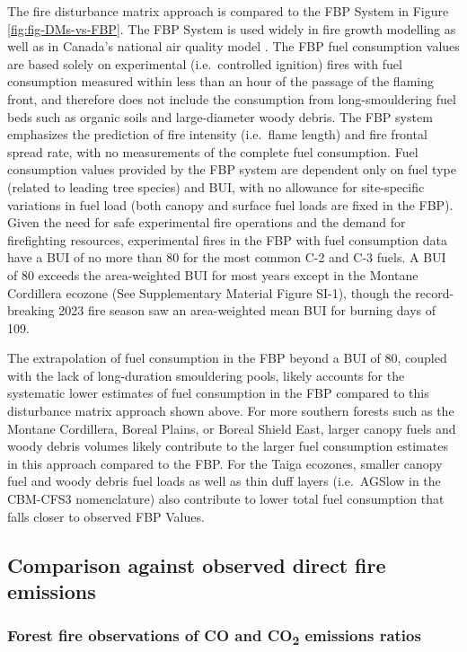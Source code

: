 \documentclass[, manuscript]{copernicus}
\begin{document}
The fire disturbance matrix approach is compared to the FBP System in
Figure \ref{fig:fig-DMs-vs-FBP}. The FBP System is used widely in fire
growth modelling as well as in Canada's national air quality model
\citep{chen2019}. The FBP fuel consumption values are based solely on
experimental (i.e.~controlled ignition) fires with fuel consumption
measured within less than an hour of the passage of the flaming front,
and therefore does not include the consumption from long-smouldering
fuel beds such as organic soils and large-diameter woody debris. The FBP
system emphasizes the prediction of fire intensity (i.e.~flame length)
and fire frontal spread rate, with no measurements of the complete fuel
consumption. Fuel consumption values provided by the FBP system are
dependent only on fuel type (related to leading tree species) and BUI,
with no allowance for site-specific variations in fuel load (both canopy
and surface fuel loads are fixed in the FBP). Given the need for safe
experimental fire operations and the demand for firefighting resources,
experimental fires in the FBP with fuel consumption data have a BUI of
no more than 80 for the most common C-2 and C-3 fuels. A BUI of 80
exceeds the area-weighted BUI for most years except in the Montane
Cordillera ecozone (See Supplementary Material Figure SI-1), though the
record-breaking 2023 fire season saw an area-weighted mean BUI for
burning days of 109.

The extrapolation of fuel consumption in the FBP beyond a BUI of 80,
coupled with the lack of long-duration smouldering pools, likely
accounts for the systematic lower estimates of fuel consumption in the
FBP compared to this disturbance matrix approach shown above. For more
southern forests such as the Montane Cordillera, Boreal Plains, or
Boreal Shield East, larger canopy fuels and woody debris volumes likely
contribute to the larger fuel consumption estimates in this approach
compared to the FBP. For the Taiga ecozones, smaller canopy fuel and
woody debris fuel loads as well as thin duff layers (i.e.~AGSlow in the
CBM-CFS3 nomenclature) also contribute to lower total fuel consumption
that falls closer to observed FBP Values.

\subsection{Comparison against observed direct fire emissions}

\subsubsection{\texorpdfstring{Forest fire observations of CO and
CO\textsubscript{2} emissions
ratios}{Forest fire observations of CO and CO2 emissions ratios}}
\end{document}
